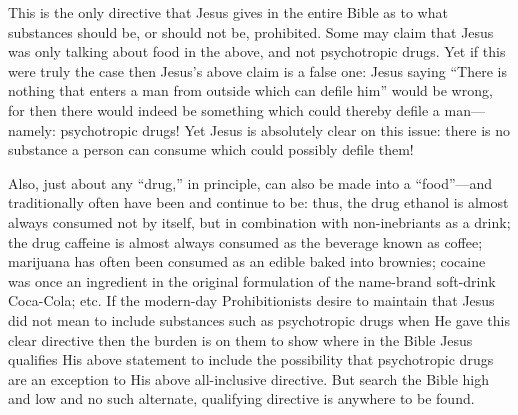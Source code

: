 \documentclass[letterpaper,12pt]{article}
\begin{document}
This is the only directive that Jesus gives in the entire Bible as to what substances should be, or should not be, prohibited. Some may claim that Jesus was only talking about food in the above, and not psychotropic drugs. Yet if this were truly the case then Jesus's above claim is a false one: Jesus saying ``There is nothing that enters a man from outside which can defile him'' would be wrong, for then there would indeed be something which could thereby defile a man---namely: psychotropic drugs! Yet Jesus is absolutely clear on this issue: there is no substance a person can consume which could possibly defile them!

Also, just about any ``drug,'' in principle, can also be made into a ``food''---and traditionally often have been and continue to be: thus, the drug ethanol is almost always consumed not by itself, but in combination with non-inebriants as a drink; the drug caffeine is almost always consumed as the beverage known as coffee; marijuana has often been consumed as an edible baked into brownies; cocaine was once an ingredient in the original formulation of the name-brand soft-drink Coca-Cola; etc. If the modern-day Prohibitionists desire to maintain that Jesus did not mean to include substances such as psychotropic drugs when He gave this clear directive then the burden is on them to show where in the Bible Jesus qualifies His above statement to include the possibility that psychotropic drugs are an exception to His above all-inclusive directive. But search the Bible high and low and no such alternate, qualifying directive is anywhere to be found.
\end{document}
